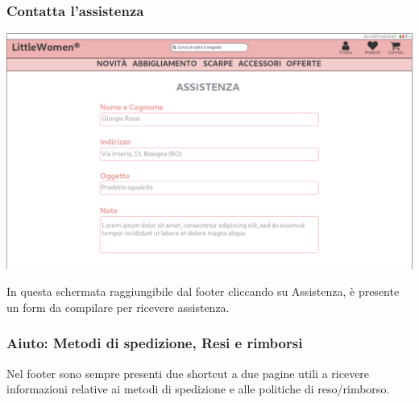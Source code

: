 \documentclass[12pt,a4paper]{report}
\begin{document}
\subsubsection*{Contatta l'assistenza}
\begin{center}
\includegraphics[width=\textwidth]{"Images Latex/Immagini Wireframe/Desktop/20 - Assistenza"}
\end{center}
In questa schermata raggiungibile dal footer cliccando su Assistenza, è presente un form da compilare per ricevere assistenza.\vspace{4mm}
\subsubsection*{Aiuto: Metodi di spedizione, Resi e rimborsi}
Nel footer sono sempre presenti due shortcut a due pagine utili a ricevere informazioni relative ai metodi di spedizione e alle politiche di reso/rimborso.
\newpage
\end{document}
